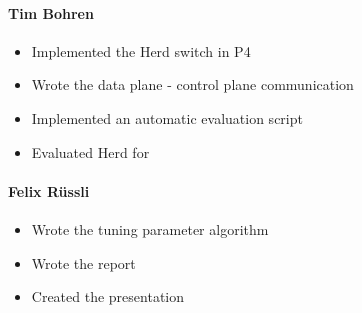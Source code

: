 \documentclass[11pt,oneside,a4paper]{article}
\begin{document}
\paragraph{Tim Bohren}
\begin{itemize}
	\item Implemented the Herd switch in P4
	\item Wrote the data plane - control plane communication
	\item Implemented an automatic evaluation script
	\item Evaluated Herd for 
\end{itemize}

\paragraph{Felix Rüssli}
\begin{itemize}
	\item Wrote the tuning parameter algorithm
	\item Wrote the report
	\item Created the presentation
\end{itemize}
\end{document}
